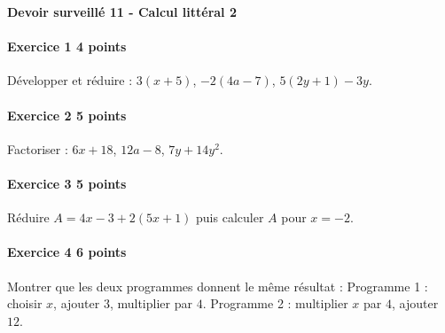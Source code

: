 \documentclass[a4paper,10pt]{article}
\newenvironment{exercice}[2]{\paragraph{Exercice #1 \hfill #2 points}\mbox{}\par}{\medskip}
\begin{document}
\begin{center}\Large\bfseries Devoir surveillé 11 - Calcul littéral 2\end{center}
\vspace{2mm}
\begin{exercice}{1}{4}Développer et réduire : $3(x+5)$, $-2(4a-7)$, $5(2y+1)-3y$.\end{exercice}\begin{exercice}{2}{5}Factoriser : $6x+18$, $12a-8$, $7y+14y^2$.\end{exercice}\begin{exercice}{3}{5}Réduire $A=4x-3+2(5x+1)$ puis calculer $A$ pour $x=-2$.\end{exercice}\begin{exercice}{4}{6}Montrer que les deux programmes donnent le même résultat : Programme 1 : choisir $x$, ajouter $3$, multiplier par $4$. Programme 2 : multiplier $x$ par $4$, ajouter $12$.\end{exercice}
\end{document}
